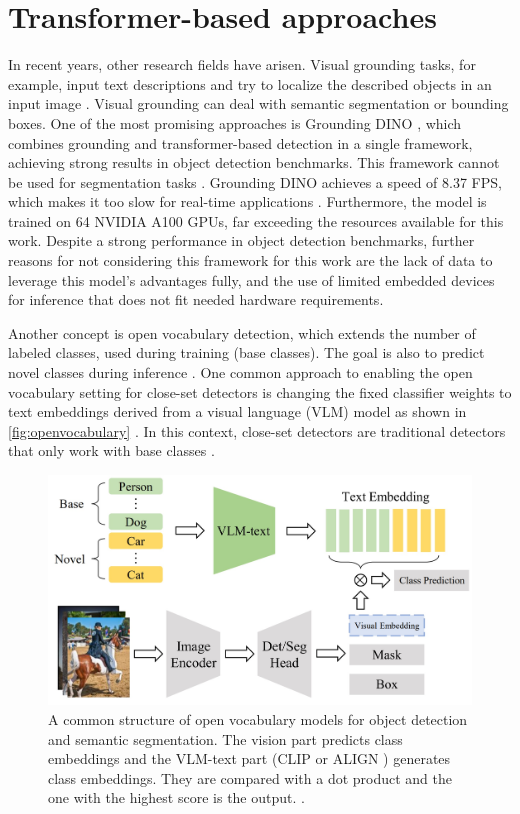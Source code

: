 \section{Transformer-based approaches}
\label{sec:transformerBasedApproaches}

In recent years, other research fields have arisen.
Visual grounding tasks, for example, input text descriptions and try to localize the described objects in an input image \cite{openvocabularysurvey2024}.
Visual grounding can deal with semantic segmentation or bounding boxes.
One of the most promising approaches is Grounding DINO \cite{groundingdino2024}, which combines grounding and transformer-based detection in a single framework, achieving strong results in object detection benchmarks.
This framework cannot be used for segmentation tasks \cite{glipv22022}.
Grounding DINO achieves a speed of 8.37 FPS, which makes it too slow for real-time applications \cite{groundingdino2024}.
Furthermore, the model is trained on 64 NVIDIA A100 GPUs, far exceeding the resources available for this work.
Despite a strong performance in object detection benchmarks, further reasons for not considering this framework for this work are the lack of data to leverage this model's advantages fully, and the use of limited embedded devices for inference that does not fit needed hardware requirements.

\vspace{0.5cm}

\noindent Another concept is open vocabulary detection, which extends the number of labeled classes, used during training (base classes).
The goal is also to predict novel classes during inference \cite{openvocabularysurvey2024}.
One common approach to enabling the open vocabulary setting for close-set detectors is changing the fixed classifier weights to text embeddings derived from a visual language (VLM) model as shown in \autoref{fig:openvocabulary} \cite{openvocabularysurvey2024}.
In this context, close-set detectors are traditional detectors that only work with base classes \cite{anonymous2024openvocabulary}.

\begin{figure}[H]
    \centering
    \includegraphics[width=0.55\linewidth]{PICs/tansformerSOTA/openvocabulary.jpg}
    \caption{A common structure of open vocabulary models for object detection and semantic segmentation. The vision part predicts class embeddings and the VLM-text part (CLIP \cite{CLIP2021} or ALIGN \cite{ALIGN2021}) generates class embeddings. They are compared with a dot product and the one with the highest score is the output. \cite{openvocabularysurvey2024}.}
    \label{fig:openvocabulary}
\end{figure}

